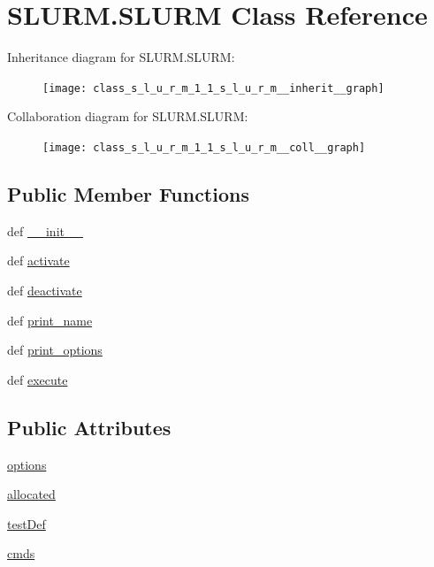 \hypertarget{class_s_l_u_r_m_1_1_s_l_u_r_m}{\section{S\-L\-U\-R\-M.\-S\-L\-U\-R\-M Class Reference}
\label{class_s_l_u_r_m_1_1_s_l_u_r_m}
}


Inheritance diagram for S\-L\-U\-R\-M.\-S\-L\-U\-R\-M\-:
\nopagebreak
\begin{figure}[H]
\begin{center}
\leavevmode
\texttt{[image: class\_s\_l\_u\_r\_m\_1\_1\_s\_l\_u\_r\_m\_\_inherit\_\_graph]}
\end{center}
\end{figure}


Collaboration diagram for S\-L\-U\-R\-M.\-S\-L\-U\-R\-M\-:
\nopagebreak
\begin{figure}[H]
\begin{center}
\leavevmode
\texttt{[image: class\_s\_l\_u\_r\_m\_1\_1\_s\_l\_u\_r\_m\_\_coll\_\_graph]}
\end{center}
\end{figure}
\subsection*{Public Member Functions}
\begin{DoxyCompactItemize}
\item 
def \hyperlink{class_s_l_u_r_m_1_1_s_l_u_r_m_aa985bacce290322ef03060d671e705a1}{\-\_\-\-\_\-init\-\_\-\-\_\-}
\item 
def \hyperlink{class_s_l_u_r_m_1_1_s_l_u_r_m_a7b3b5d04275a853d623f6fff36b76e7e}{activate}
\item 
def \hyperlink{class_s_l_u_r_m_1_1_s_l_u_r_m_a4622d35bba26ef97a305e9d057e5db6c}{deactivate}
\item 
def \hyperlink{class_s_l_u_r_m_1_1_s_l_u_r_m_a79a9d29418a1a20a9d502c0723c3e8e7}{print\-\_\-name}
\item 
def \hyperlink{class_s_l_u_r_m_1_1_s_l_u_r_m_ad735f2669f29aca338d4dc61b6423284}{print\-\_\-options}
\item 
def \hyperlink{class_s_l_u_r_m_1_1_s_l_u_r_m_ab53b5b6093e23284f0f8494fc2be2263}{execute}
\end{DoxyCompactItemize}
\subsection*{Public Attributes}
\begin{DoxyCompactItemize}
\item 
\hyperlink{class_s_l_u_r_m_1_1_s_l_u_r_m_a652a43986b8bda5c6ddb866ab0513ac8}{options}
\item 
\hyperlink{class_s_l_u_r_m_1_1_s_l_u_r_m_aee4130d6ff2007d08fad045aedd69781}{allocated}
\item 
\hyperlink{class_s_l_u_r_m_1_1_s_l_u_r_m_a9b08ef79e039a8524f1fa6712b45182b}{test\-Def}
\item 
\hyperlink{class_s_l_u_r_m_1_1_s_l_u_r_m_ab755a940fd09c8fa416c177f692d31d6}{cmds}
\end{DoxyCompactItemize}


